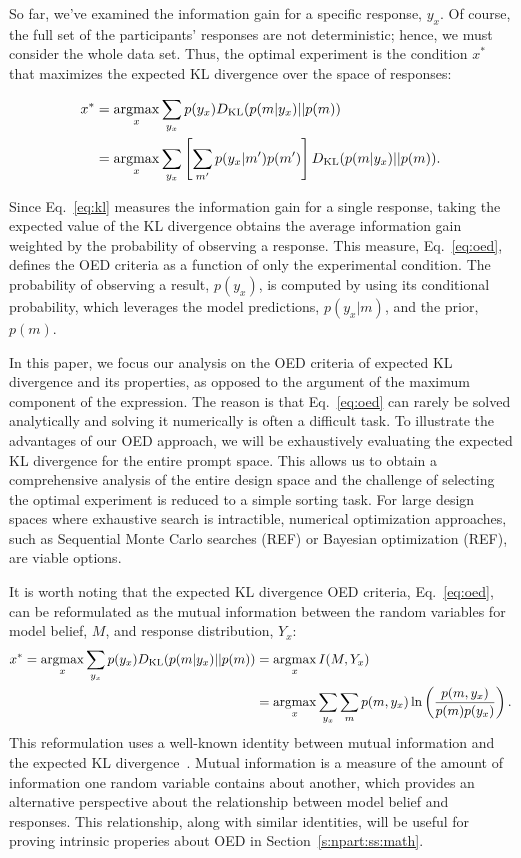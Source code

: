 \documentclass{article}
\newcommand{\argmax}{\operatornamewithlimits{argmax}}
\begin{document}
So far, we've examined the information gain for a specific response, $y_x$.
Of course, the full set of the participants' responses are not deterministic; hence, we must consider the whole data set. 
Thus, the optimal experiment is the condition $x^*$ that maximizes the expected KL divergence over the space of responses:

\begin{align}
x^{*} &= \argmax_{x} \sum\limits_{y_x} p(y_x) D_{\text{KL}}(p(m|y_x) || p(m)) \notag \\
    &= \argmax_{x} \sum\limits_{y_x} \left[\sum\limits_{m'} p(y_x|m')p(m')\right] D_{\text{KL}}(p(m|y_x) || p(m)). \label{eq:oed}
\end{align}

Since Eq.~\ref{eq:kl} measures the information gain for a single response, taking the expected value of the KL divergence obtains the average information gain weighted by the probability of observing a response. This measure, Eq.~\ref{eq:oed}, defines the OED criteria as a function of only the experimental condition. The probability of observing a result, $p(y_x)$, is computed by using its conditional probability, which leverages the model predictions, $p(y_x|m)$, and the prior, $p(m)$.

In this paper, we focus our analysis on the OED criteria of expected KL divergence and its properties, as opposed to the argument of the maximum component of the expression. The reason is that Eq.~\ref{eq:oed} can rarely be solved analytically and solving it numerically is often a difficult task. To illustrate the advantages of our OED approach, we will be exhaustively evaluating the expected KL divergence for the entire prompt space. This allows us to obtain a comprehensive analysis of the entire design space and the challenge of selecting the optimal experiment is reduced to a simple sorting task. For large design spaces where exhaustive search is intractible, numerical optimization approaches, such as Sequential Monte Carlo searches (REF) or Bayesian optimization (REF), are viable options. 

It is worth noting that the expected KL divergence OED criteria, Eq.~\ref{eq:oed}, can be reformulated as the mutual information between the random variables for model belief, $M$, and response distribution, $Y_x$:
\begin{align}
x^* = \argmax_{x} \sum\limits_{y_x} p(y_x) D_{\text{KL}}(p(m|y_x) || p(m)) &= \argmax_{x} I(M, Y_x) \notag \\
    &= \argmax_{x} \sum\limits_{y_x} \sum\limits_{m} p(m, y_x) \ln \left( \frac{p(m, y_x)}{p(m)p(y_x)}\right). \label{eq:mi}
\end{align}
This reformulation uses a well-known identity between mutual information and the expected KL divergence~\cite{cover91:eit}. Mutual information is a measure of the amount of information one random variable contains about another, which provides an alternative perspective about the relationship between model belief and responses. This relationship, along with similar identities, will be useful for proving intrinsic properies about OED in Section~\ref{s:npart:ss:math}.
\end{document}

